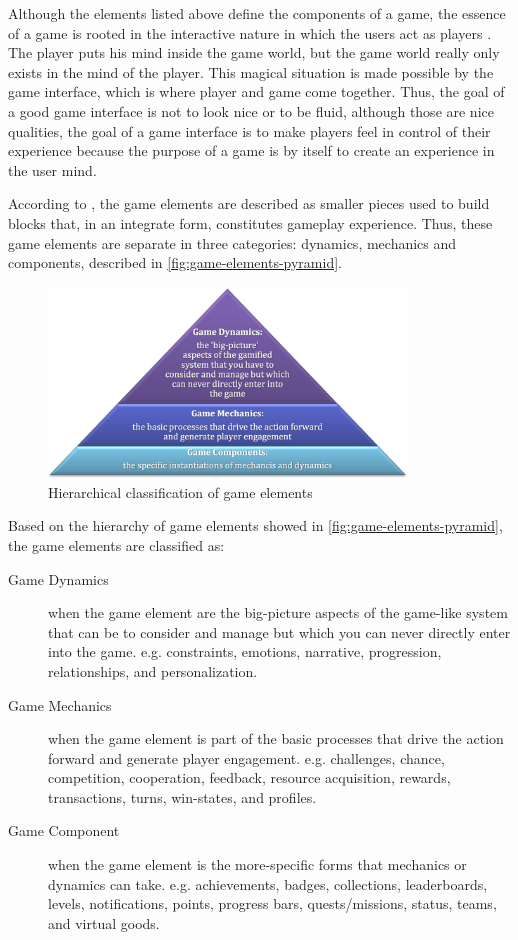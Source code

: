 Although the elements listed above define the components of a game, the essence of a game is rooted in the interactive nature in which the users act as players \cite{Schell2008}.
The player puts his mind inside the game world, but the game world really only exists in the mind of the player.
This magical situation is made possible by the game interface, which is where player and game come together.
Thus, the goal of a good game interface is not to look nice or to be fluid, although those are nice qualities, the goal of a game interface is to make players feel in control of their experience because the purpose of a game is by itself to create an experience in the user mind.

According to , the game elements are described as smaller pieces used to build blocks that, in an integrate form, constitutes gameplay experience. Thus, these game elements are separate in three categories: dynamics, mechanics and components, described in \autoref{fig:game-elements-pyramid}.

\begin{figure}[htb]
 \caption{Hierarchical classification of game elements}
 \label{fig:game-elements-pyramid}
 \centering
 \includegraphics[width=0.85\textwidth]{images/chap-general-background/game-elements-pyramid.png}
\end{figure}

Based on the hierarchy of game elements showed in \autoref{fig:game-elements-pyramid}, the game elements are classified as:
\begin{description}
\item[Game Dynamics] when the game element are the big-picture aspects of the game-like system that can be to consider and manage but which you can never directly enter into the game. e.g. constraints, emotions, narrative, progression, relationships, and personalization.
\item[Game Mechanics] when the game element is part of the basic processes that drive the action forward and generate player engagement. e.g. challenges, chance, competition, cooperation, feedback, resource acquisition, rewards, transactions, turns, win-states, and profiles.
\item[Game Component] when the game element is the more-specific forms that mechanics or dynamics can take. e.g. achievements, badges, collections, leaderboards, levels, notifications, points, progress bars, quests/missions, status, teams, and virtual goods.
\end{description}

